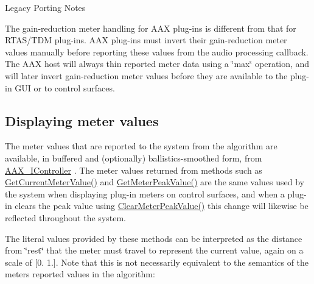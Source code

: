 \begin{DoxyRefDesc}{Legacy Porting Notes}
\item[\hyperlink{a00384__porting_notes000001}{Legacy Porting Notes}]The gain-\/reduction meter handling for A\+A\+X plug-\/ins is different from that for R\+T\+A\+S/\+T\+D\+M plug-\/ins. A\+A\+X plug-\/ins must invert their gain-\/reduction meter values manually before reporting these values from the audio processing callback. The A\+A\+X host will always thin reported meter data using a \char`\"{}max\char`\"{} operation, and will later invert gain-\/reduction meter values before they are available to the plug-\/in G\+U\+I or to control surfaces. \end{DoxyRefDesc}
\hypertarget{a00337_AdditionalFeatures_Meters_displaying}{}\subsection{Displaying meter values}\label{a00337_AdditionalFeatures_Meters_displaying}
The meter values that are reported to the system from the algorithm are available, in buffered and (optionally) ballistics-\/smoothed form, from \hyperlink{a00090}{A\+A\+X\+\_\+\+I\+Controller} . The meter values returned from methods such as \hyperlink{a00090_a13de9cc4bb7fb3848fbe12622c033135}{Get\+Current\+Meter\+Value()} and \hyperlink{a00090_a85db3824256005c97689925750103765}{Get\+Meter\+Peak\+Value()} are the same values used by the system when displaying plug-\/in meters on control surfaces, and when a plug-\/in clears the peak value using \hyperlink{a00090_aa8fe057d2f53109e75662da0a492fa34}{Clear\+Meter\+Peak\+Value()} this change will likewise be reflected throughout the system.

The literal values provided by these methods can be interpreted as the distance from \char`\"{}rest\char`\"{} that the meter must travel to represent the current value, again on a scale of \mbox{[}0. 1.\mbox{]}. Note that this is not necessarily equivalent to the semantics of the meter\textquotesingle{}s reported values in the algorithm\+:

